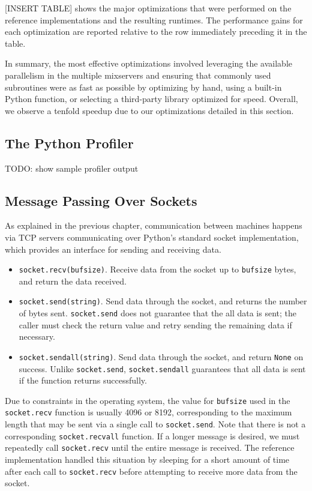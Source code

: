 [INSERT TABLE] shows the major optimizations that were performed on the reference implementations and the resulting runtimes. The performance gains for each optimization are reported relative to the row immediately preceding it in the table.

In summary, the most effective optimizations involved leveraging the available parallelism in the multiple mixservers and ensuring that commonly used subroutines were as fast as possible by optimizing by hand, using a built-in Python function, or selecting a third-party library optimized for speed. Overall, we observe a tenfold speedup due to our optimizations detailed in this section.

\subsection{The Python Profiler}

TODO: show sample profiler output

\subsection{Message Passing Over Sockets}

As explained in the previous chapter, communication between machines happens via TCP servers communicating over Python's standard socket implementation, which provides an interface for sending and receiving data.
\begin{itemize}
\item \texttt{socket.recv(bufsize)}. Receive data from the socket up to \texttt{bufsize} bytes, and return the data received.
\item \texttt{socket.send(string)}. Send data through the socket, and returns the number of bytes sent. \texttt{socket.send} does not guarantee that the all data is sent; the caller must check the return value and retry sending the remaining data if necessary.
\item \texttt{socket.sendall(string)}. Send data through the socket, and return \texttt{None} on success. Unlike \texttt{socket.send}, \texttt{socket.sendall} guarantees that all data is sent if the function returns successfully.
\end{itemize}
Due to constraints in the operating system, the value for \texttt{bufsize} used in the \texttt{socket.recv} function is usually 4096 or 8192, corresponding to the maximum length that may be sent via a single call to \texttt{socket.send}. Note that there is not a corresponding \texttt{socket.recvall} function. If a longer message is desired, we must repeatedly call \texttt{socket.recv} until the entire message is received. The reference implementation handled this situation by sleeping for a short amount of time after each call to \texttt{socket.recv} before attempting to receive more data from the socket.

